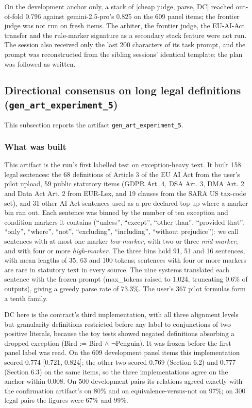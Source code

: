\documentclass[11pt,letterpaper]{article}
\begin{document}
On the development anchor only, a stack of [cheap judge, parse, DC] reached out-of-fold 0.796 against gemini-2.5-pro's 0.825 on the 609 panel items; the frontier judge was not run on fresh items. The arbiter, the frontier judge, the EU-AI-Act transfer and the rule-marker signature as a secondary stack feature were not run. The session also received only the last 200 characters of its task prompt, and the prompt was reconstructed from the sibling sessions' identical template; the plan was followed as written.

\subsection{Directional consensus on long legal definitions (\texorpdfstring{\textup{\nolinkurl{gen_art_experiment_5}}}{gen art experiment 5})}

This subsection reports the artifact \texorpdfstring{\textup{\nolinkurl{gen_art_experiment_5}}}{gen art experiment 5}.

\subsubsection{What was built}

This artifact is the run's first labelled test on exception-heavy text. It built 158 legal sentences: the 68 definitions of Article 3 of the EU AI Act from the user's pilot upload, 59 public statutory items (GDPR Art. 4, DSA Art. 3, DMA Art. 2 and Data Act Art. 2 from EUR-Lex, and 19 clauses from the SARA US tax-code set), and 31 other AI-Act sentences used as a pre-declared top-up where a marker bin ran out. Each sentence was binned by the number of ten exception and condition markers it contains (``unless'', ``except'', ``other than'', ``provided that'', ``only'', ``where'', ``not'', ``excluding'', ``including'', ``without prejudice''): we call sentences with at most one marker \emph{low-marker}, with two or three \emph{mid-marker}, and with four or more \emph{high-marker}. The three bins hold 91, 51 and 16 sentences, with mean lengths of 35, 63 and 100 tokens; sentences with four or more markers are rare in statutory text in every source. The nine systems translated each sentence with the frozen prompt (max\_\allowbreak{}tokens raised to 1,024, truncating 0.6\% of outputs), giving a greedy parse rate of 73.3\%. The user's 367 pilot formulas form a tenth family.

DC here is the contract's third implementation, with all three alignment levels but granularity definitions restricted before any label to conjunctions of two positive literals, because the toy tests showed negated definitions absorbing a dropped exception (Bird := Bird $\wedge$ $\neg$Penguin). It was frozen before the first panel label was read. On the 609 development panel items this implementation scored 0.774 [0.721, 0.824]; the other two scored 0.769 (Section 6.2) and 0.777 (Section 6.3) on the same items, so the three implementations agree on the anchor within 0.008. On 500 development pairs its relations agreed exactly with the confirmation artifact's on 80\% and on equivalence-versus-not on 97\%; on 300 legal pairs the figures were 67\% and 99\%.
\end{document}

